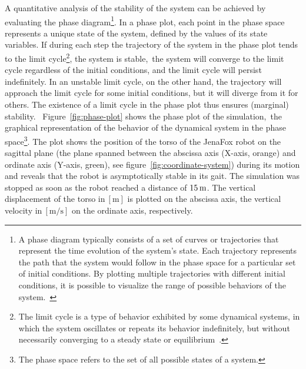 A quantitative analysis of the stability of the system can be achieved by evaluating the phase diagram\footnote{A phase diagram typically consists of a set of curves or trajectories that represent the time evolution of the system's state. Each trajectory represents the path that the system would follow in the phase space for a particular set of initial conditions. By plotting multiple trajectories with different initial conditions, it is possible to visualize the range of possible behaviors of the system.~\cite{Goswami1996}}. In a phase plot, each point in the phase space represents a unique state of the system, defined by the values of its state variables. If during each step the trajectory of the system in the phase plot tends to the limit cycle\footnote{The limit cycle is a type of behavior exhibited by some dynamical systems, in which the system oscillates or repeats its behavior indefinitely, but without necessarily converging to a steady state or equilibrium~\cite{Goswami1996}.}, the system is stable,~\ie the system will converge to the limit cycle regardless of the initial conditions, and the limit cycle will persist indefinitely. In an unstable limit cycle, on the other hand, the trajectory will approach the limit cycle for some initial conditions, but it will diverge from it for others. The existence of a limit cycle in the phase plot thus ensures (marginal) stability.~\cite{Goswami1996} Figure~\ref{fig:phase-plot} shows the phase plot of the simulation,~\ie the graphical representation of the behavior of the dynamical system in the phase space\footnote{The phase space refers to the set of all possible states of a system.}. The plot shows the position of the torso of the JenaFox robot on the sagittal plane (\ie the plane spanned between the abscissa axis (X-axis, orange) and ordinate axis (Y-axis, green), see figure~\ref{fig:coordinate-system}) during its motion and reveals that the robot is asymptotically stable in its gait. The simulation was stopped as soon as the robot reached a distance of $15\,\textrm{\si{\metre}}$. The vertical displacement of the torso in$~\left[\si{\metre}\right]$ is plotted on the abscissa axis, the vertical velocity in$~\left[\si{\metre\per\second}\right]$ on the ordinate axis, respectively.


